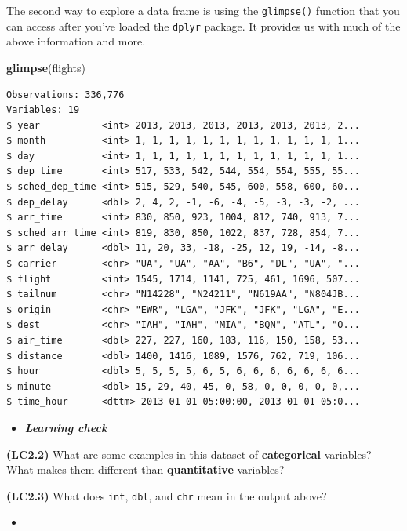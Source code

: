 \documentclass[12pt,]{krantz}
\makeatletter
\newenvironment{Shaded}{\begin{snugshade}}{\end{snugshade}}
\newcommand{\KeywordTok}[1]{\textcolor[rgb]{0.27,0.27,0.27}{\textbf{#1}}}
\newcommand{\NormalTok}[1]{#1}
\newenvironment{kframe}{%
\medskip{}
\setlength{\fboxsep}{.8em}
 \def\at@end@of@kframe{}%
 \ifinner\ifhmode%
  \def\at@end@of@kframe{\end{minipage}}%
  \begin{minipage}{\columnwidth}%
 \fi\fi%
 \def\FrameCommand##1{\hskip\@totalleftmargin \hskip-\fboxsep
 \colorbox{shadecolor}{##1}\hskip-\fboxsep
     \hskip-\linewidth \hskip-\@totalleftmargin \hskip\columnwidth}%
 \MakeFramed {\advance\hsize-\width
   \@totalleftmargin\z@ \linewidth\hsize
   \@setminipage}}%
 {\par\unskip\endMakeFramed%
 \at@end@of@kframe}
\renewenvironment{Shaded}{\begin{kframe}}{\end{kframe}}
\newenvironment{rmdblock}[1]
  {\begin{shaded*}
  \begin{itemize}
  \renewcommand{\labelitemi}{
    \raisebox{-.7\height}[0pt][0pt]{
    }
  }
  \item
  }
  {
  \end{itemize}
  \end{shaded*}
  }
\newenvironment{learncheck}
  {\begin{rmdblock}{warning}}
  {\end{rmdblock}}
\theoremstyle{definition}
\theoremstyle{definition}
\theoremstyle{definition}
\theoremstyle{remark}
\makeatother
\begin{document}
The second way to explore a data frame is using the \texttt{glimpse()}
function that you can access after you've loaded the \texttt{dplyr}
package. It provides us with much of the above information and more.

\begin{Shaded}
\begin{Highlighting}[]
\KeywordTok{glimpse}\NormalTok{(flights)}
\end{Highlighting}
\end{Shaded}

\begin{verbatim}
Observations: 336,776
Variables: 19
$ year           <int> 2013, 2013, 2013, 2013, 2013, 2013, 2...
$ month          <int> 1, 1, 1, 1, 1, 1, 1, 1, 1, 1, 1, 1, 1...
$ day            <int> 1, 1, 1, 1, 1, 1, 1, 1, 1, 1, 1, 1, 1...
$ dep_time       <int> 517, 533, 542, 544, 554, 554, 555, 55...
$ sched_dep_time <int> 515, 529, 540, 545, 600, 558, 600, 60...
$ dep_delay      <dbl> 2, 4, 2, -1, -6, -4, -5, -3, -3, -2, ...
$ arr_time       <int> 830, 850, 923, 1004, 812, 740, 913, 7...
$ sched_arr_time <int> 819, 830, 850, 1022, 837, 728, 854, 7...
$ arr_delay      <dbl> 11, 20, 33, -18, -25, 12, 19, -14, -8...
$ carrier        <chr> "UA", "UA", "AA", "B6", "DL", "UA", "...
$ flight         <int> 1545, 1714, 1141, 725, 461, 1696, 507...
$ tailnum        <chr> "N14228", "N24211", "N619AA", "N804JB...
$ origin         <chr> "EWR", "LGA", "JFK", "JFK", "LGA", "E...
$ dest           <chr> "IAH", "IAH", "MIA", "BQN", "ATL", "O...
$ air_time       <dbl> 227, 227, 160, 183, 116, 150, 158, 53...
$ distance       <dbl> 1400, 1416, 1089, 1576, 762, 719, 106...
$ hour           <dbl> 5, 5, 5, 5, 6, 5, 6, 6, 6, 6, 6, 6, 6...
$ minute         <dbl> 15, 29, 40, 45, 0, 58, 0, 0, 0, 0, 0,...
$ time_hour      <dttm> 2013-01-01 05:00:00, 2013-01-01 05:0...
\end{verbatim}

\begin{learncheck}
\textbf{\emph{Learning check}}
\end{learncheck}

\textbf{(LC2.2)} What are some examples in this dataset of
\textbf{categorical} variables? What makes them different than
\textbf{quantitative} variables?

\textbf{(LC2.3)} What does \texttt{int}, \texttt{dbl}, and \texttt{chr}
mean in the output above?

\begin{learncheck}

\end{learncheck}
\end{document}
